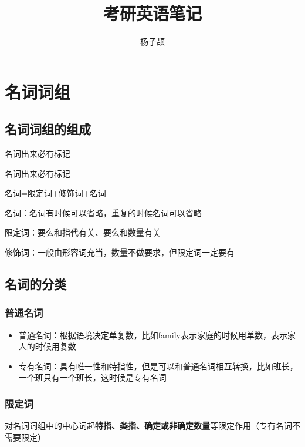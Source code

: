\documentclass{ctexart}
\title{考研英语笔记}
\author{杨子颉}
\begin{document}
\maketitle
\newpage
\tableofcontents
\newpage

\section{名词词组}
   \subsection{名词词组的组成}
   名词出来必有标记
    \begin{tcolorbox}[colback=blue!5!white]
        名词出来必有标记

       名词=限定词+修饰词+名词

       名词：名词有时候可以省略，重复的时候名词可以省略

       限定词：要么和指代有关、要么和数量有关

       修饰词：一般由形容词充当，数量不做要求，但限定词一定要有
    \end{tcolorbox}
    \subsection{名词的分类}
        \subsubsection{普通名词}
        \begin{itemize}
            \item[1)] 普通名词：根据语境决定单复数，比如family表示家庭的时候用单数，表示家人的时候用复数
            \item[2)] 专有名词：具有唯一性和特指性，但是可以和普通名词相互转换，比如班长，一个班只有一个班长，这时候是专有名词 
        \end{itemize}
        \subsubsection{限定词}
        对名词词组中的中心词起\textbf{特指、类指、确定或非确定数量}等限定作用（专有名词不需要限定）
\end{document}
